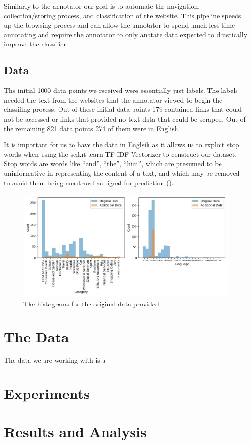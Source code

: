 Similarly to the annotator our goal is to automate the navigation, collection/storing process, and classification of the website. This pipeline speeds up the browsing process and can allow the annotator to spend much less time annotating and require the annotator to only anotate data expected to drastically improve the classifier.

\subsection{Data}

The initial 1000 data points we received were essentially just labels. The labels needed the text from the websites that the annotator viewed to begin the classifing process. Out of these initial data points 179 contained links that could not be accessed or links that provided no text data that could be scraped. Out of the remaining 821 data points 274 of them were in English. 

It is important for us to have the data in Englsih as it allows us to exploit stop words when using the scikit-learn TF-IDF Vectorizer to construct our dataset. Stop words are words like “and”, “the”, “him”, which are presumed to be uninformative in representing the content of a text, and which may be removed to avoid them being construed as signal for prediction (\cite{sklearn62feature}).

\begin{figure}[!h]
  \centering
  \includegraphics[width=\textwidth]{../img/data_overview.jpg}
  \caption{The histograms for the original data provided.}
  \label{fig:data_histogram}
\end{figure}


\section{The Data}
The data we are working with is a 


\section{Experiments}

\section{Results and Analysis}
